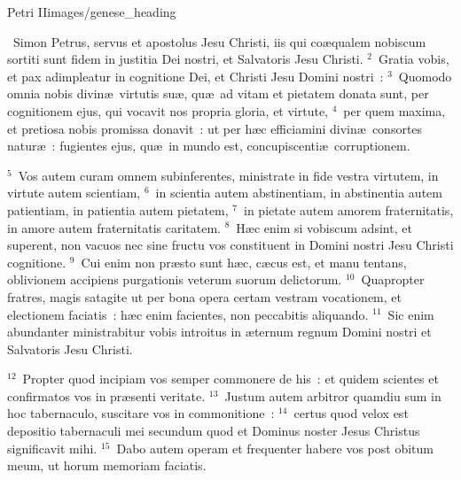 {Petri II}{images/genese_heading}

~\lettrine[lines=10,image=true,loversize=0.05,lraise=-0.03]{S}{}imon Petrus, servus et apostolus Jesu Christi, iis qui co\ae qualem nobiscum sortiti sunt fidem in justitia Dei nostri, et Salvatoris Jesu Christi.
${}^{2}$~Gratia vobis, et pax adimpleatur in cognitione Dei, et Christi Jesu Domini nostri~:
${}^{3}$~Quomodo omnia nobis divin\ae\ virtutis su\ae , qu\ae\ ad vitam et pietatem donata sunt, per cognitionem ejus, qui vocavit nos propria gloria, et virtute,
${}^{4}$~per quem maxima, et pretiosa nobis promissa donavit~: ut per h\ae c efficiamini divin\ae\ consortes natur\ae~: fugientes ejus, qu\ae\ in mundo est, concupiscenti\ae\ corruptionem.


${}^{5}$~Vos autem curam omnem subinferentes, ministrate in fide vestra virtutem, in virtute autem scientiam,
${}^{6}$~in scientia autem abstinentiam, in abstinentia autem patientiam, in patientia autem pietatem,
${}^{7}$~in pietate autem amorem fraternitatis, in amore autem fraternitatis caritatem.
${}^{8}$~H\ae c enim si vobiscum adsint, et superent, non vacuos nec sine fructu vos constituent in Domini nostri Jesu Christi cognitione.
${}^{9}$~Cui enim non pr\ae sto sunt h\ae c, c\ae cus est, et manu tentans, oblivionem accipiens purgationis veterum suorum delictorum.
${}^{10}$~Quapropter fratres, magis satagite ut per bona opera certam vestram vocationem, et electionem faciatis~: h\ae c enim facientes, non peccabitis aliquando.
${}^{11}$~Sic enim abundanter ministrabitur vobis introitus in \ae ternum regnum Domini nostri et Salvatoris Jesu Christi.


${}^{12}$~Propter quod incipiam vos semper commonere de his~: et quidem scientes et confirmatos vos in pr\ae senti veritate.
${}^{13}$~Justum autem arbitror quamdiu sum in hoc tabernaculo, suscitare vos in commonitione~:
${}^{14}$~certus quod velox est depositio tabernaculi mei secundum quod et Dominus noster Jesus Christus significavit mihi.
${}^{15}$~Dabo autem operam et frequenter habere vos post obitum meum, ut horum memoriam faciatis.


